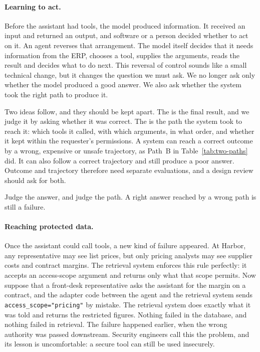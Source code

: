\paragraph{Learning to act.} Before the assistant had tools, the model produced information. It received an input and returned an output, and software or a person decided whether to act on it. An agent reverses that arrangement. The model itself decides that it needs information from the ERP, chooses a tool, supplies the arguments, reads the result and decides what to do next. This reversal of control sounds like a small technical change, but it changes the question we must ask. We no longer ask only whether the model produced a good answer. We also ask whether the system took the right path to produce it.

Two ideas follow, and they should be kept apart. The  is the final result, and we judge it by asking whether it was correct. The  is the path the system took to reach it: which tools it called, with which arguments, in what order, and whether it kept within the requester's permissions. A system can reach a correct outcome by a wrong, expensive or unsafe trajectory, as Path~B in Table~\ref{tab:two-paths} did. It can also follow a correct trajectory and still produce a poor answer. Outcome and trajectory therefore need separate evaluations, and a design review should ask for both.

\begin{keyidea}
Judge the answer, and judge the path. A right answer reached by a wrong path is still a failure.
\end{keyidea}

\paragraph{Reaching protected data.} Once the assistant could call tools, a new kind of failure appeared. At Harbor, any representative may see list prices, but only pricing analysts may see supplier costs and contract margins. The retrieval system enforces this rule perfectly: it accepts an access-scope argument and returns only what that scope permits. Now suppose that a front-desk representative asks the assistant for the margin on a contract, and the adapter code between the agent and the retrieval system sends \texttt{access\_scope="pricing"} by mistake. The retrieval system does exactly what it was told and returns the restricted figures. Nothing failed in the database, and nothing failed in retrieval. The failure happened earlier, when the wrong authority was passed downstream. Security engineers call this the  problem, and its lesson is uncomfortable: a secure tool can still be used insecurely.

